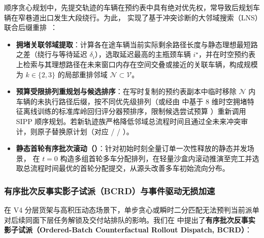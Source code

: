 顺序贪心规划中，先提交轨迹的车辆在预约表中具有绝对优先权，常导致后规划车辆在窄巷道出口发生大段绕行。为此， 实现了基于冲突诊断的大邻域搜索（LNS）联合后缀重排~\cite{li2021mapflns}：
\begin{itemize}
  \item \textbf{拥堵关联邻域提取}：计算各在途车辆当前实际剩余路径长度与静态理想最短路之差（绕行与等待延迟 $\delta_i$），选取延迟最高的主瓶颈车辆 $i^\star$，并在时空预约表上检索与其理想路径在未来窗口内存在空间交叠或接近的关联车辆，构成规模为 $k \in \{2, 3\}$ 的局部重排邻域 $\mathcal{N} \subset \mathcal{V}$。
  \item \textbf{预算受限排列重规划与候选排序}：在写时复制的预约表副本中临时移除 $\mathcal{N}$ 内车辆的未执行路径后缀，按不同优先级排列（或经由  中基于 8 维时空拥堵特征离线训练的标准库岭回归评分器预排序，限制候选尝试预算 ）重新调用 SIPP 顺序规划。若新轨迹族严格降低邻域总流程时间且通过全未来冲突审计，则原子替换原计划（对应  /  / ）。
  \item \textbf{静态首轮有序批次滚动（）}：针对初始时刻全量订单一次性释放的静态并发场景， 在 $t=0$ 构造多组首轮多车分配排列，在轻量沙盒内滚动推演至完工并选取总流程时间最优的首轮分配提交，从源头改善多车初始流向分布。
\end{itemize}

\subsubsection{有序批次反事实影子试派（BCRD）与事件驱动无损加速}

在 V4 分层货架与高积压动态场景下，单步贪心或瞬时二分匹配无法预判当前派单对后续同面下层任务解锁及交付站排队的影响。我们在  中提出了\textbf{有序批次反事实影子试派（Ordered-Batch Counterfactual Rollout Dispatch, BCRD）}：

